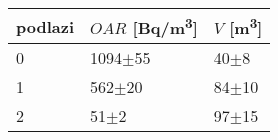 \begin{tabular}{lll}
\toprule
podlazi & $OAR$ [\si{Bq/m^3}] & $V$ [\si{m^3}] \\
\midrule
0 &           1094$\pm$55 &         40$\pm$8 \\
1 &            562$\pm$20 &        84$\pm$10 \\
2 &              51$\pm$2 &        97$\pm$15 \\
\bottomrule
\end{tabular}

